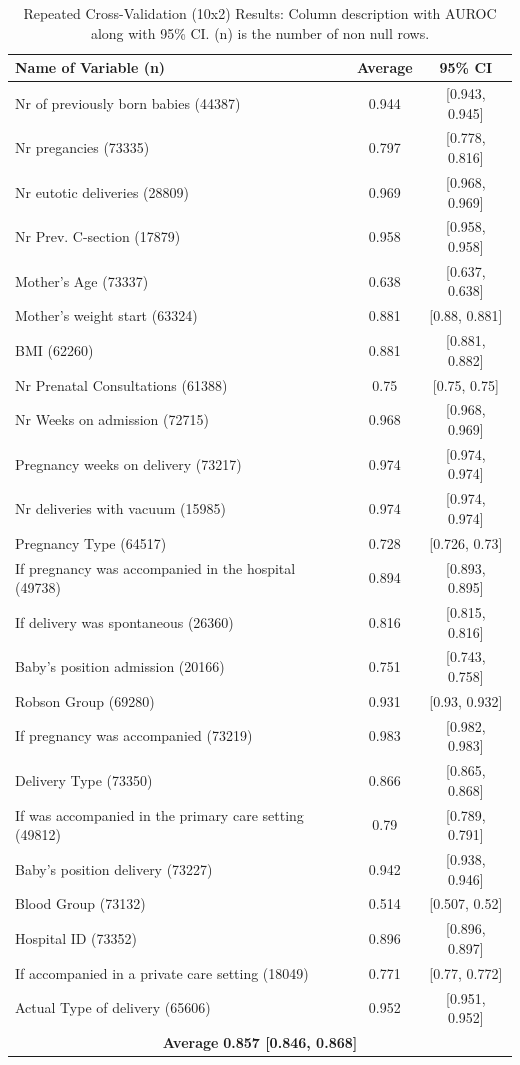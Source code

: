     
\begin{table}[h!]
    \caption{Repeated Cross-Validation (10x2) Results: Column description with AUROC along with 95\% CI. (n) is the number of non null rows.} \label{tab:result_auc} 
   
   \renewcommand{\arraystretch}{1.2}
   \centering
   \begin{tabular} {lcc }
    \toprule
    Name of Variable (n) &               Average &               95\% CI \\
 \midrule
   Nr of previously born babies (44387) & 0.944 & [0.943, 0.945] \\
   Nr pregancies (73335) & 0.797 & [0.778, 0.816] \\
   Nr eutotic deliveries (28809) & 0.969 & [0.968, 0.969] \\
   Nr Prev. C-section (17879)& 0.958 & [0.958, 0.958] \\
   Mother’s Age (73337) & 0.638 & [0.637, 0.638] \\
   Mother’s weight start (63324)& 0.881 & [0.88, 0.881] \\
   BMI (62260) & 0.881 & [0.881, 0.882] \\
   Nr Prenatal Consultations (61388) & 0.75 & [0.75, 0.75] \\
   Nr Weeks on admission (72715) & 0.968 & [0.968, 0.969] \\
   Pregnancy weeks on delivery (73217) & 0.974 & [0.974, 0.974] \\
   Nr deliveries with vacuum (15985) & 0.974 & [0.974, 0.974] \\
   Pregnancy Type (64517) & 0.728 & [0.726, 0.73]\\
   If pregnancy was accompanied in the hospital (49738)& 0.894 & [0.893, 0.895] \\
    If delivery was spontaneous (26360) & 0.816 & [0.815, 0.816] \\
    Baby’s position admission (20166)& 0.751 & [0.743, 0.758] \\
    Robson Group (69280) & 0.931 & [0.93, 0.932] \\
    If pregnancy was accompanied (73219) & 0.983 & [0.982, 0.983] \\
    Delivery Type (73350)& 0.866 & [0.865, 0.868] \\
    If was accompanied in the primary care setting (49812) & 0.79 & [0.789, 0.791] \\
    Baby’s position delivery (73227) & 0.942 & [0.938, 0.946] \\
    Blood Group (73132) & 0.514 & [0.507, 0.52] \\
    Hospital ID (73352) & 0.896 & [0.896, 0.897] \\
    If accompanied in a private care setting (18049) & 0.771 & [0.77, 0.772] \\
    Actual Type of delivery (65606) & 0.952 & [0.951, 0.952] \\
   \hline
    \multicolumn{3}{c}{\textbf{Average}  \textbf{0.857 [0.846, 0.868]}} \\
   
   \hline
   \end{tabular}
   \end{table}
